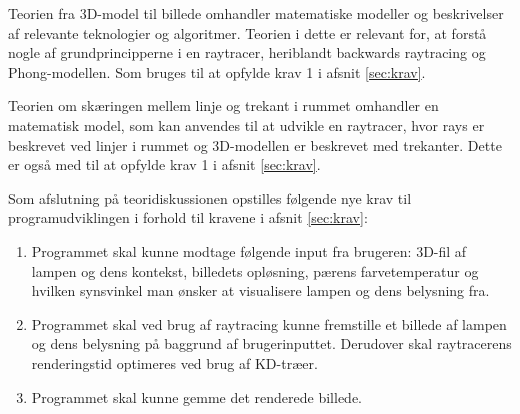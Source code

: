 Teorien fra 3D-model til billede omhandler matematiske modeller og beskrivelser af relevante teknologier og algoritmer. Teorien i dette er relevant for, at forstå nogle af grundprincipperne i en raytracer, heriblandt backwards raytracing og Phong-modellen. Som bruges til at opfylde krav 1 i afsnit \ref{sec:krav}.

Teorien om skæringen mellem linje og trekant i rummet omhandler en matematisk model, som kan anvendes til at udvikle en raytracer, hvor rays er beskrevet ved linjer i rummet og 3D-modellen er beskrevet med trekanter. Dette er også med til at opfylde krav 1 i afsnit \ref{sec:krav}.

Som afslutning på teoridiskussionen opstilles følgende nye krav til programudviklingen i forhold til kravene i afsnit \ref{sec:krav}:
\begin{enumerate}
    \item Programmet skal kunne modtage følgende input fra brugeren: 3D-fil af lampen og dens kontekst, billedets opløsning, pærens farvetemperatur og hvilken synsvinkel man ønsker at visualisere lampen og dens belysning fra.
    \item Programmet skal ved brug af raytracing kunne fremstille et billede af lampen og dens belysning på baggrund af brugerinputtet. Derudover skal raytracerens renderingstid optimeres ved brug af KD-træer.
    \item Programmet skal kunne gemme det renderede billede.
\end{enumerate}